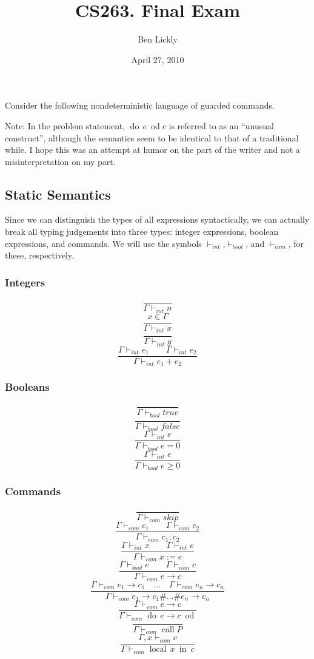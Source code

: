 \documentclass{article}
\title{CS263. Final Exam}
\author{Ben Lickly}
\date{April 27, 2010}
\newcommand{\problem}[1]
{\subsubsection*{} %
\vspace{-16pt} \section{} \vspace{-22pt} \qquad
#1%
\bigskip \bigskip
}
\newcommand{\proves}{\vdash}
\newcommand{\dood}[1]{\operatorname{do}\, #1\ \operatorname{od}}
\newcommand{\callP}{\operatorname{call} P}
\newcommand{\localin}[2]{\operatorname{local}\, #1\ \operatorname{in}\ #2}
\begin{document}
\maketitle

\problem{Consider the following nondeterministic language of guarded commands.
}

Note: In the problem statement, $\dood{e}{c}$ is referred to as an ``unusual
construct'', although the semantics seem to be identical to that of a
traditional while.  I hope this was an attempt at humor on the part of the
writer and not a misinterpretation on my part.

\subsection{Static Semantics}

    Since we can distinguish the types of all expressions syntactically, we can
    actually break all typing judgements into three types: integer expressions,
    boolean expressions, and commands.  We will use the symbols
    $\proves_{int}$,$\proves_{bool}$, and $\proves_{com}$, for these,
    respectively.
\subsubsection*{Integers}
\[\frac{}
{\Gamma \proves_{int} n}
\]
\[\frac{x \in \Gamma}
{\Gamma \proves_{int} x}
\]
\[\frac{}
{\Gamma \proves_{int} g}
\]
\[\frac{\Gamma \proves_{int} e_1 \qquad \Gamma \proves_{int} e_2}
{\Gamma \proves_{int} e_1 + e_2}
\]

\subsubsection*{Booleans}
\[\frac{}
{\Gamma \proves_{bool} true}
\]
\[\frac{}
{\Gamma \proves_{bool} false}
\]
\[\frac{\Gamma \proves_{int} e}
{\Gamma \proves_{bool} e = 0}
\]
\[\frac{\Gamma \proves_{int} e}
{\Gamma \proves_{bool} e \ge 0}
\]

\subsubsection*{Commands}
\[\frac{}
{\Gamma \proves_{com} skip}
\]
\[\frac{\Gamma \proves_{com} c_1 \qquad \Gamma \proves_{com} c_2}
{\Gamma \proves_{com} c_1; c_2}
\]
\[\frac{\Gamma \proves_{int} x \qquad \Gamma \proves_{int} e}
{\Gamma \proves_{com} x := e}
\]
\[\frac{\Gamma \proves_{bool} e \qquad \Gamma \proves_{com} c}
{\Gamma \proves_{com} e \rightarrow c}
\]
\[\frac{\Gamma \proves_{com} e_1 \rightarrow c_1 \quad \dots \quad
        \Gamma \proves_{com} e_n \rightarrow c_n}
{\Gamma \proves_{com} e_1 \rightarrow c_1 \# \dots \# e_n \rightarrow c_n}
\]
\[\frac{\Gamma \proves_{com} e \rightarrow c}
{\Gamma \proves_{com} \dood{e \rightarrow c}}
\]
\[\frac{}
{\Gamma \proves_{com} \callP }
\]
\[\frac{\Gamma,x \proves_{com} c}
{\Gamma \proves_{com} \localin{x}{c}}
\]
\end{document}
